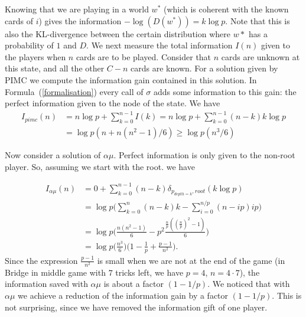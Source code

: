 \documentclass[runningheads]{llncs}
\begin{document}
Knowing that we are playing in a world $w^*$ (which is coherent with the known cards of $i$) gives the information $-\log(D(w^*)) = k\log p$. Note that this is also the KL-divergence between the certain distribution where $w*$ has a probability of $1$ and $D$. 
We next measure the total information $I(n)$ given to the players when $n$ cards are to be played. Consider that $n$ cards are unknown at this state, and all the other $C-n$ cards are known.
For a solution given by PIMC we compute the information gain contained in this solution. In Formula~(\ref{formalisation}) every call of $\sigma$ adds some information to this gain: the perfect information given to the node of the state. We have
\begin{align*}
    I_{pimc}(n) &= n \log p + \sum_{k=0}^{n-1} I(k)
    = n\log p + \sum_{k=0}^{n-1} (n-k) k \log p \\
    &= \log p (n + {n(n^2 - 1)}/6) \geq \log p ( n^3/6 )
\end{align*}

Now consider a solution of $\alpha\mu$. Perfect information is only given to the non-root player. So, assuming we start with the root. we have

\begin{align*}
    I_{\alpha\mu}(n) &= 0 + \sum_{k=0}^{n-1} (n-k) \delta_{p_{depth=k}, root}(k \log p) \\
    &= \log p \bigg( \sum_{k=0}^{n} (n-k) k - \sum_{i=0}^{n/p} (n-ip) ip \bigg) \\
    &= \log p \bigg(\frac{n(n^2-1)}6 - p^2\frac{\frac{n}{p}((\frac{n}{p})^2-1)}6 \bigg) \\
    &= \log p \bigg( \frac{n^3}6 \bigg) \bigg( 1 - \frac1p + \frac{p-1}{n^2}\bigg).
\end{align*}
Since the expression $\frac{p-1}{n^2}$ is small when we are not at the end of the game (in Bridge in middle game with $7$ tricks left, we have $p=4$, $n=4 \cdot 7$), the information saved with $\alpha\mu$ is about a factor $(1 - 1/p)$. We noticed that with $\alpha\mu$ we achieve a reduction of the information gain by a factor $(1 - 1/p)$. This is not surprising, since we have removed the  
information gift of one player. 
\end{document}
